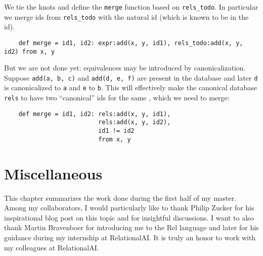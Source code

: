 We tie the knots and define the \verb|merge| function based on \verb|rels_todo|.
In particular we merge ids from \verb|rels_todo| 
 with the natural id (which is known to be in the id).
\begin{verbatim}
    def merge = id1, id2: expr:add(x, y, id1), rels_todo:add(x, y, id2) from x, y
\end{verbatim}

But we are not done yet: equivalences may be introduced by canonicalization.
Suppose \verb|add(a, b, c)| and \verb|add(d, e, f)| are present in the database
 and later \verb|d| is canonicalized to \verb|a| and \verb|e| to \verb|b|.
This will effectively make the canonical database \verb|rels| to have
 two ``canonical'' ids for the same \enode, which we need to merge:

\begin{verbatim}
    def merge = id1, id2: rels:add(x, y, id1), 
                          rels:add(x, y, id2),
                          id1 != id2 
                          from x, y
\end{verbatim}


\section{Miscellaneous}

This chapter summarizes the work done during the first half of my master.
Among my collaborators,
 I would particularly like to thank Philip Zucker 
 for his inspirational blog post on this topic
 and for insightful discussions.
I want to also thank 
 Martin Bravenboer for introducing me to the Rel language
 and later for his guidance during my internship at RelationalAI.
It is truly an honor to work with my colleagues at RelationalAI.